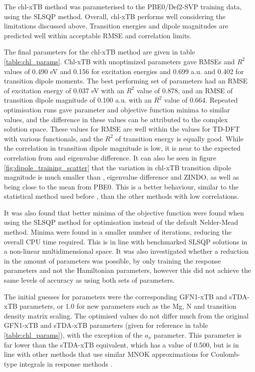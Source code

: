 The chl-xTB method was parameterised to the PBE0/Def2-SVP training data, using the
SLSQP method. Overall, chl-xTB performs well considering the limitations discussed 
above. Transition energies and dipole magnitudes are predicted well within acceptable
RMSE and correlation limits.

The final parameters for the chl-xTB method are given in table \ref{table:chl_params}.
Chl-xTB with unoptimized parameters gave RMSEs and $R^2$ values of 0.490 eV and 0.156 
for excitation energies and 0.699 a.u. and 0.402 for transition dipole moments. The
best performing set of parameters had an RMSE of excitation energy of 0.037 eV with
 an $R^2$ value of 0.878, and an RMSE of transition dipole magnitude of 0.100 a.u. 
with an $R^2$ value of 0.664. Repeated optimisation runs gave parameter and objective
function minima to similar values, and the difference in these values can be attributed
to the complex solution space. These values for RMSE are well within the values
for TD-DFT with various functionals, and the $R^2$ of transition energy is equally
good. While the correlation in transition dipole magnitude is low, it is near to
the expected correlation from \dscf and eigenvalue difference. It can also be seen
in figure \ref{fig:dipole_training_scatter} that the variation in chl-xTB transition
dipole magnitude is much smaller than \dscf, eigenvalue difference and ZINDO, as
well as being close to the mean from PBE0. This is a better behaviour, similar to
the statistical method used before \cite{Stross2016}, than the other methods with 
low correlations.

It was also found that better minima of the objective function were found when using
the SLSQP method for optimisation instead of the default Nelder-Mead method. Minima
were found in a smaller number of iterations, reducing the overall CPU time required.
This is in line with benchmarked SLSQP solutions in a non-linear multidimensional space.
It was also investigated whether a reduction in the amount of parameters was possible,
by only training the response parameters and not the Hamiltonian parameters, however 
this did not achieve the same levels of accuracy as using both sets of parameters.

The initial guesses for parameters were the corresponding GFN1-xTB and sTDA-xTB
parameters, or 1.0 for new parameters such as the Mg, N and transition density matrix
scaling. The optimised values do not differ much from the original GFN1-xTB and 
sTDA-xTB parameters (given for reference in table \ref{table:chl_params}), with
the exception of the $a_x$ parameter. This parameter is far lower than the sTDA-xTB
equivalent, which has a value of 0.500, but is in line with other methods that use 
similar MNOK approximations for Coulomb-type integrals in response methods \cite{Cho2021}.

